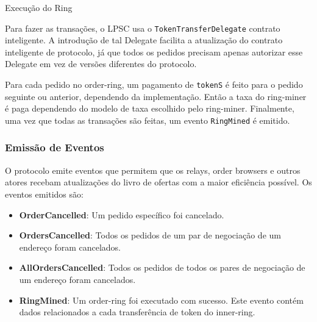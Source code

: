\documentclass[UTF8,nofonts]{article}
\makeatletter
\newenvironment{figurehere}
 {\def\@captype{figure}}
 {}
\makeatother
\begin{document}
\begin{multicols}{2}
\begin{center}
\begin{figurehere}
\centering
{}
\caption{Execução do Ring}
\label{fig:settlement}
\end{figurehere}
\end{center}

Para fazer as transações, o LPSC usa o \verb|TokenTransferDelegate| contrato inteligente. A introdução de tal Delegate facilita a atualização do contrato inteligente de protocolo, já que todos os pedidos precisam apenas autorizar esse Delegate em vez de versões diferentes do protocolo.

Para cada pedido no order-ring, um pagamento de \verb|tokenS| é feito para o pedido seguinte ou anterior, dependendo da implementação. Então a taxa do ring-miner é paga dependendo do modelo de taxa escolhido pelo ring-miner. Finalmente, uma vez que todas as transações são feitas, um evento \verb|RingMined| é emitido.

\subsubsection{Emissão de Eventos\label{sec:events}}

O protocolo emite eventos que permitem que os relays, order browsers e outros atores recebam atualizações do livro de ofertas com a maior eficiência possível. Os eventos emitidos são:

\begin{itemize}
	\item \textbf{OrderCancelled}: Um pedido específico foi cancelado.
	\item \textbf{OrdersCancelled}: Todos os pedidos de um par de negociação de um endereço foram cancelados.
	\item \textbf{AllOrdersCancelled}: Todos os pedidos de todos os pares de negociação de um endereço foram cancelados.
	\item \textbf{RingMined}: Um order-ring  foi executado com sucesso. Este evento contém dados relacionados a cada transferência de token do inner-ring.
\end{itemize}



\end{multicols}
\end{document}
